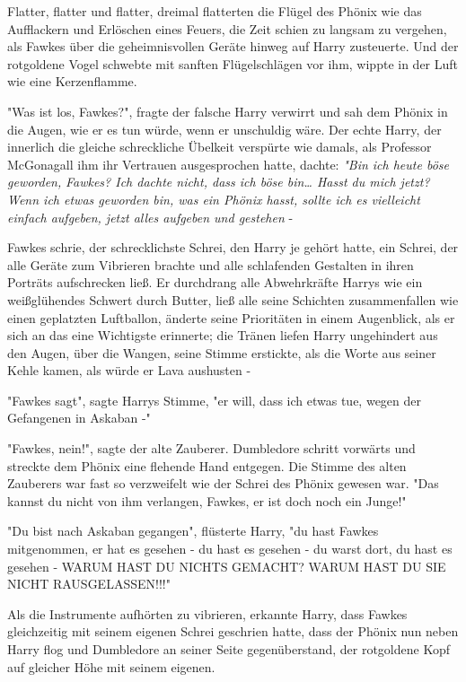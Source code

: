 {Flatter, flatter und flatter, dreimal flatterten die Flügel des Phönix wie das Aufflackern und Erlöschen eines Feuers, die Zeit schien zu langsam zu vergehen, als Fawkes über die geheimnisvollen Geräte hinweg auf Harry zusteuerte. Und der rotgoldene Vogel schwebte mit sanften Flügelschlägen vor ihm, wippte in der Luft wie eine Kerzenflamme.

"Was ist los, Fawkes?", fragte der falsche Harry verwirrt und sah dem Phönix in die Augen, wie er es tun würde, wenn er unschuldig wäre. Der echte Harry, der innerlich die gleiche schreckliche Übelkeit verspürte wie damals, als Professor McGonagall ihm ihr Vertrauen ausgesprochen hatte, dachte: \emph{"Bin ich heute böse geworden,} \emph{Fawkes? Ich dachte nicht, dass ich böse bin… Hasst du mich jetzt? Wenn ich etwas geworden bin, was ein Phönix hasst, sollte ich es vielleicht einfach aufgeben, jetzt alles aufgeben und gestehen} -

Fawkes schrie, der schrecklichste Schrei, den Harry je gehört hatte, ein Schrei, der alle Geräte zum Vibrieren brachte und alle schlafenden Gestalten in ihren Porträts aufschrecken ließ. Er durchdrang alle Abwehrkräfte Harrys wie ein weißglühendes Schwert durch Butter, ließ alle seine Schichten zusammenfallen wie einen geplatzten Luftballon, änderte seine Prioritäten in einem Augenblick, als er sich an das eine Wichtigste erinnerte; die Tränen liefen Harry ungehindert aus den Augen, über die Wangen, seine Stimme erstickte, als die Worte aus seiner Kehle kamen, als würde er Lava aushusten -

"Fawkes sagt", sagte Harrys Stimme, "er will, dass ich etwas tue, wegen der Gefangenen in Askaban -"

"Fawkes, nein!", sagte der alte Zauberer. Dumbledore schritt vorwärts und streckte dem Phönix eine flehende Hand entgegen. Die Stimme des alten Zauberers war fast so verzweifelt wie der Schrei des Phönix gewesen war. "Das kannst du nicht von ihm verlangen, Fawkes, er ist doch noch ein Junge!"

"Du bist nach Askaban gegangen", flüsterte Harry, "du hast Fawkes mitgenommen, er hat es gesehen - du hast es gesehen - du warst dort, du hast es gesehen - WARUM HAST DU NICHTS GEMACHT? WARUM HAST DU SIE NICHT RAUSGELASSEN!!!"

Als die Instrumente aufhörten zu vibrieren, erkannte Harry, dass Fawkes gleichzeitig mit seinem eigenen Schrei geschrien hatte, dass der Phönix nun neben Harry flog und Dumbledore an seiner Seite gegenüberstand, der rotgoldene Kopf auf gleicher Höhe mit seinem eigenen.

}
